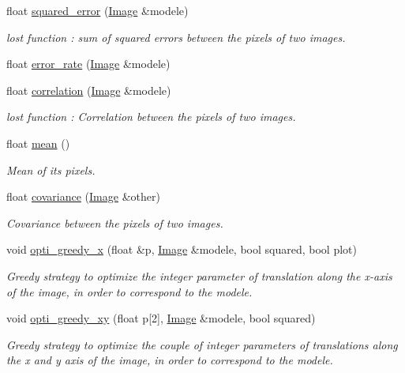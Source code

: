 \begin{DoxyCompactItemize}
\item 
float \hyperlink{class_image_aaa3ca7a74f46cfbfc90b91204c2b16e3}{squared\+\_\+error} (\hyperlink{class_image}{Image} \&modele)
\begin{DoxyCompactList}\small\item\em lost function \+: sum of squared errors between the pixels of two images. \end{DoxyCompactList}\item 
float \hyperlink{class_image_a10800b4a1dde1d81827264904d948d49}{error\+\_\+rate} (\hyperlink{class_image}{Image} \&modele)
\item 
float \hyperlink{class_image_a398c9613ec6733d880c41f038a32baf5}{correlation} (\hyperlink{class_image}{Image} \&modele)
\begin{DoxyCompactList}\small\item\em lost function \+: Correlation between the pixels of two images. \end{DoxyCompactList}\item 
float \hyperlink{class_image_a3293e639f72645c62e07f5b2b3173100}{mean} ()
\begin{DoxyCompactList}\small\item\em Mean of its pixels. \end{DoxyCompactList}\item 
float \hyperlink{class_image_a1901bca6b241617d4ed24a534aef7076}{covariance} (\hyperlink{class_image}{Image} \&other)
\begin{DoxyCompactList}\small\item\em Covariance between the pixels of two images. \end{DoxyCompactList}\item 
void \hyperlink{class_image_a81319b99e3a51f1edc87c1b37ecaf677}{opti\+\_\+greedy\+\_\+x} (float \&p, \hyperlink{class_image}{Image} \&modele, bool squared, bool plot)
\begin{DoxyCompactList}\small\item\em Greedy strategy to optimize the integer parameter of translation along the x-\/axis of the image, in order to correspond to the modele. \end{DoxyCompactList}\item 
void \hyperlink{class_image_aa88be19239da61154efd07ab51a4e316}{opti\+\_\+greedy\+\_\+xy} (float p\mbox{[}2\mbox{]}, \hyperlink{class_image}{Image} \&modele, bool squared)
\begin{DoxyCompactList}\small\item\em Greedy strategy to optimize the couple of integer parameters of translations along the x and y axis of the image, in order to correspond to the modele. \end{DoxyCompactList}\item 

\end{DoxyCompactItemize}
